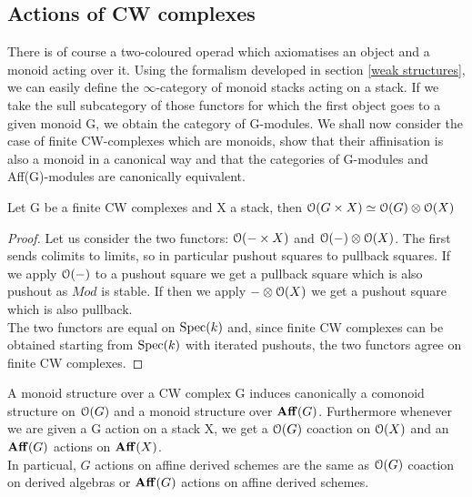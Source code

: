 \begin{refsection}

\subsection{Actions of CW complexes}
There is of course a two-coloured operad which axiomatises an object and a monoid acting over it. Using the formalism developed in section \ref{weak structures}, we can
easily define the $\infty$-category of monoid stacks acting on a stack. If we take the sull subcategory of those functors for which the first object goes to a given
monoid G, we obtain the category of G-modules. 
We shall now consider the case of finite CW-complexes which are monoids, show that their affinisation is also a monoid in a canonical way and that the categories
of G-modules and Aff(G)-modules are canonically equivalent.

\begin{lemma}
Let G be a finite CW complexes and X a stack, then $\mathcal{O}(G\times X)\simeq \mathcal{O}(G)\otimes \mathcal{O}(X)$
\end{lemma}

\begin{proof}
Let us consider the two functors: $\mathcal{O}(-\times X)$ and $\mathcal{O}(-)\otimes \mathcal{O}(X)$. The first sends colimits to limits, so in particular pushout
squares to pullback squares. If we apply $\mathcal{O}(-)$ to a pushout square we get a pullback square which is also pushout as $Mod$ is stable. If then we 
apply $-\otimes \mathcal{O}(X)$ we get a pushout square which is also pullback.\\
The two functors are equal on $\mathrm{Spec}(k)$ and, since finite CW complexes can be obtained starting from $\mathrm{Spec}(k)$ with iterated pushouts, the two 
functors agree on finite CW complexes.
\end{proof}

\begin{corollary}
A monoid structure over a CW complex G induces canonically a comonoid structure on $\mathcal{O}(G)$ and a monoid structure over $\mathbf{Aff}(G)$. Furthermore
whenever we are given a G action on a stack X, we get a $\mathcal{O}(G)$ coaction on $\mathcal{O}(X)$ and an $\mathbf{Aff}(G)$ actions on $\mathbf{Aff}(X)$.\\
In particual, $G$ actions on affine derived schemes are the same as $\mathcal{O}(G)$ coaction on derived algebras or $\mathbf{Aff}(G)$ actions on affine derived schemes.
\end{corollary}


\end{refsection}
